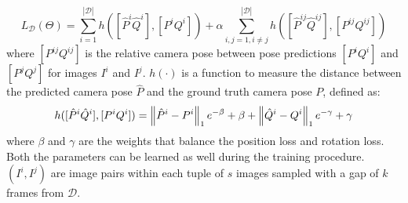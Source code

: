 \small
\begin{equation}
    L_\mathcal{D}(\Theta) = \sum\limits_{i=1}^{|\mathcal{D}|} h([\hat{P}^i \hat{Q}^i], [P^i Q^i]) + \alpha\sum\limits_{i,j=1, i\neq j}^{|\mathcal{D}|} h([\hat{P}^{ij} \hat{Q}^{ij}], [P^{ij} Q^{ij}])
    \label{eq:mapnet-loss}
\end{equation}
\normalsize
where $[P^{ij} Q^{ij}]$ is the relative camera pose between pose predictions $[P^i Q^i]$ and $[P^j Q^j]$ for images $I^i$ and $I^j$.
$h(\cdot)$ is a function to measure the distance between the predicted camera pose $\hat{P}$ and the ground truth camera pose $P$, defined as:
\small
\begin{equation}
    h([\hat{P}^i \hat{Q}^i], [P^i Q^i]) = \norm{\hat{P}^i-P^i}_1 e^{-\beta} + \beta + \norm{\hat{Q}^i-Q^i}_1 e^{-\gamma} + \gamma
    \label{eq:mapnet-loss-h}
\end{equation}
\normalsize
where $\beta$ and $\gamma$ are the weights that balance the position loss and rotation loss. Both the parameters can be learned as well during the training procedure. $(I^i, I^j)$ are image pairs within each tuple of $s$ images sampled with a gap of $k$ frames from $\mathcal{D}$.

